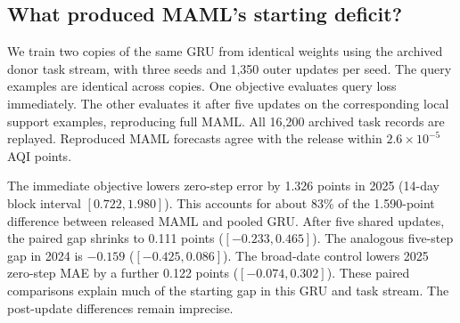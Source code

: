 \subsection{What produced MAML's starting deficit?}
We train two copies of the same GRU from identical weights using the archived donor task stream, with three seeds and 1,350 outer updates per seed. The query examples are identical across copies. One objective evaluates query loss immediately. The other evaluates it after five updates on the corresponding local support examples, reproducing full MAML. All 16,200 archived task records are replayed. Reproduced MAML forecasts agree with the release within $2.6\times10^{-5}$ AQI points.

\begin{table}[t]
\caption{2025 macro MAE in AQI points before and after five shared local SGD steps ($\eta=0.03$). The paired-task rows isolate the source objective. The broader-dates row changes the query-date sampling under immediate loss.}
\label{tab:objective}
\centering\small

\end{table}

The immediate objective lowers zero-step error by 1.326 points in 2025 (14-day block interval $[0.722,1.980]$). This accounts for about 83\% of the 1.590-point difference between released MAML and pooled GRU. After five shared updates, the paired gap shrinks to 0.111 points ($[-0.233,0.465]$). The analogous five-step gap in 2024 is $-0.159$ ($[-0.425,0.086]$). The broad-date control lowers 2025 zero-step MAE by a further 0.122 points ($[-0.074,0.302]$). These paired comparisons explain much of the starting gap in this GRU and task stream. The post-update differences remain imprecise.
